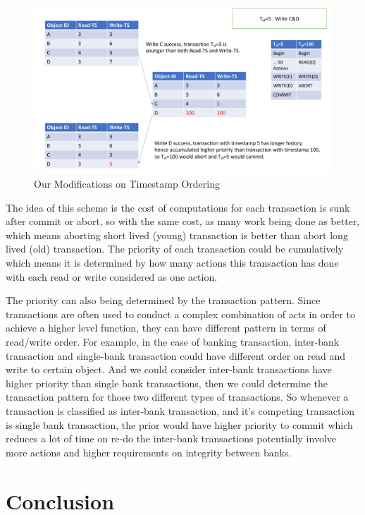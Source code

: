 \begin{figure}[H]
	\centering
	\includegraphics[width=0.9\linewidth]{ourTO.pdf}
	\caption{Our Modifications on Timestamp Ordering}
\end{figure}

The idea of this scheme is the cost of computations for each transaction is sunk after commit or abort, so with the same cost, as many work being done as better, which means aborting short lived (young) transaction is better than abort long lived (old) transaction. The priority of each transaction could be cumulatively which means it is determined by how many actions this transaction has done with each read or write considered as one action. 

The priority can also being determined by the transaction pattern. Since transactions are often used to conduct a complex combination of acts in order to achieve a higher level function, they can have different pattern in terms of read/write order. For example, in the case of banking transaction, inter-bank transaction and single-bank transaction could have different order on read and write to certain object. And we could consider inter-bank transactions have higher priority than single bank transactions, then we could determine the transaction pattern for those two different types of transactions. So whenever a transaction is classified as inter-bank transaction, and it's competing transaction is single bank transaction, the prior would have higher priority to commit which reduces a lot of time on re-do the inter-bank transactions potentially involve more actions and higher requirements on integrity between banks.

\section{Conclusion}


